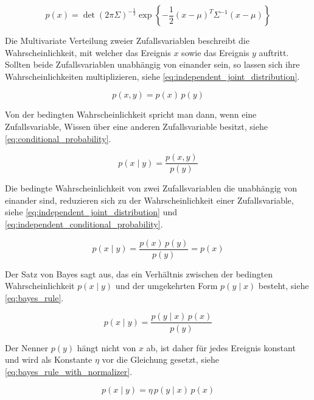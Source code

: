 \begin{equation}
p(x) = \operatorname{det}{\left( 2 \pi \Sigma \right)}^{-\frac12}  \exp{ \left\{ -\frac12 (x - \mu)^T \Sigma^{-1} (x - \mu) \right\} } \label{eq:multivariate_normal_distribution}
\end{equation}

Die Multivariate Verteilung zweier Zufallsvariablen beschreibt die Wahrscheinlichkeit, mit welcher das Ereignis $x$ sowie das Ereignis $y$ auftritt. Sollten beide Zufallsvariablen unabhängig von einander sein, so lassen sich ihre Wahrscheinlichkeiten multiplizieren, siehe \autoref{eq:independent_joint_distribution}.

\begin{equation}
p(x, y) = p(x) \, p(y) \label{eq:independent_joint_distribution}
\end{equation}

Von der bedingten Wahrscheinlichkeit spricht man dann, wenn eine Zufallsvariable, Wissen über eine anderen Zufallsvariable besitzt, siehe \autoref{eq:conditional_probability}.

\begin{equation}
p(x \mid y) = \frac{p(x, y)}{p(y)} \label{eq:conditional_probability}
\end{equation}

Die bedingte Wahrscheinlichkeit von zwei Zufallsvariablen die unabhängig von einander sind, reduzieren sich zu der Wahrscheinlichkeit einer Zufallsvariable, siehe \autoref{eq:independent_joint_distribution} und \autoref{eq:independent_conditional_probability}.

\begin{equation}
p(x \mid y) = \frac{p(x) \, p(y)}{p(y)} = p(x) \label{eq:independent_conditional_probability}
\end{equation}

Der Satz von Bayes sagt aus, das ein Verhältnis zwischen der bedingten Wahrscheinlichkeit $p(x \mid y)$ und der umgekehrten Form $p(y \mid x)$ besteht, siehe \autoref{eq:bayes_rule}.

\begin{equation}
p(x \mid y) = \frac{p(y \mid x) \, p(x)}{p(y)} \label{eq:bayes_rule}
\end{equation}

Der Nenner $p(y)$ hängt nicht von $x$ ab, ist daher für jedes Ereignis konstant und wird als Konstante $\eta$ vor die Gleichung gesetzt, siehe \autoref{eq:bayes_rule_with_normalizer}.

\begin{equation}
p(x \mid y) = \eta \, p(y \mid x) \, p(x) \label{eq:bayes_rule_with_normalizer}
\end{equation}


